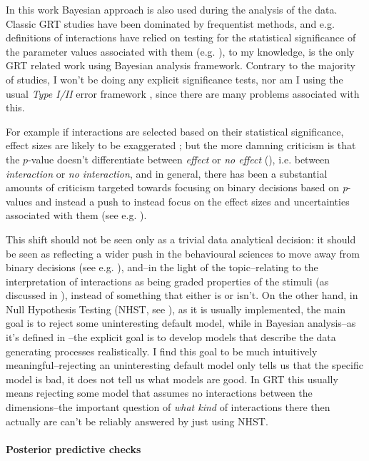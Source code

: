 \documentclass{article}\usepackage{knitr}
\begin{document}
In this work Bayesian approach is also used during the analysis of the data. Classic GRT studies have been dominated by frequentist methods, and e.g. definitions of interactions have relied on testing for the statistical significance of the parameter values associated with them (e.g. \cite{ashby2015, wickens1992}), to my knowledge, \cite{silbert2010} is the only GRT related work using Bayesian analysis framework. Contrary to the majority of studies, I won't be doing any explicit significance tests, nor am I using the usual \textit{Type I/II} error framework \citep[pp. 470 - 471]{christensen1997}, since there are many problems associated with this.

For example if interactions are selected based on their statistical significance, effect sizes are likely to be exaggerated \citep{gelman2018}; but the more damning criticism is that the $p$-value doesn't differentiate between \textit{effect} or \textit{no effect} (\cite{greenland2016}), i.e. between \textit{interaction} or \textit{no interaction}, and in general, there has been a substantial amounts of criticism targeted towards focusing on binary decisions based on \textit{p}-values and instead a push to instead focus on the effect sizes and uncertainties associated with them (see e.g. \citet{kline2004, greenland2016, steiger1997}). 

This shift should not be seen only as a trivial data analytical decision: it should be seen as reflecting a wider push in the behavioural sciences to move away from binary decisions (see e.g. \citet{amrhein2017}), and--in the light of the topic--relating to the interpretation of interactions as being graded properties of the stimuli (as discussed in \citet{kemler1993}), instead of something that either is or isn't. On the other hand, in Null Hypothesis Testing (NHST, see \citet[Chapter 11]{kruschke2015}), as it is usually implemented, the main goal is to reject some uninteresting default model, while in Bayesian analysis--as it's defined in \citet{bda}--the explicit goal is to develop models that describe the data generating processes realistically. I find this goal to be much intuitively meaningful--rejecting an uninteresting default model only tells us that the specific model is bad, it does not tell us what models are good. In GRT this usually means rejecting some model that assumes no interactions between the dimensions--the important question of \textit{what kind} of interactions there then actually are can't be reliably answered by just using NHST.

\paragraph{Posterior predictive checks}
\end{document}
